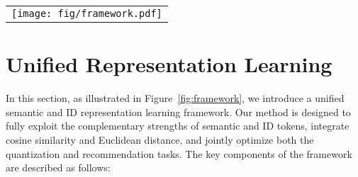 
\begin{figure*}[htb!]
		\centering
		\begin{tabular}{c}
		    	\texttt{[image: fig/framework.pdf]}
		\end{tabular}
	\caption{Framework of the unified semantic and ID representation learning. Firstly, the model integrates both semantic tokens, learned through RQ-VAE, and ID tokens for the recommendation task. Secondly, cosine similarity is applied in the first two layers to decouple accumulated embeddings, while Euclidean distance is utilized in the final layer to effectively distinguish unique items. Finally, the overall model is optimized in an end-to-end manner, combining the recommendation loss, RQ-VAE quantization loss, and text reconstruction loss.}	\label{fig:framework}
\end{figure*}

\section{Unified Representation Learning}
In this section, as illustrated in Figure~\ref{fig:framework}, we introduce a unified semantic and ID representation learning framework. Our method is designed to fully exploit the complementary strengths of semantic and ID tokens, integrate cosine similarity and Euclidean distance, and jointly optimize both the quantization and recommendation tasks. The key components of the framework are described as follows:

